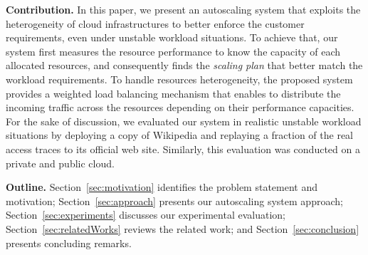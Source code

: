 




\textbf{Contribution.}  In this paper, we present an autoscaling system that exploits the heterogeneity of cloud infrastructures to better enforce the customer requirements, even under unstable workload situations. To achieve that, our system first measures the resource performance to know the capacity of each allocated resources, and consequently finds the \emph{scaling plan} that better match the workload requirements. To handle resources heterogeneity, the proposed system provides a weighted load balancing mechanism that enables to distribute the incoming traffic across the resources depending on their performance capacities.
For the sake of discussion, we evaluated our system in realistic unstable workload situations by deploying a copy of Wikipedia and replaying a fraction of the real access traces to its official web site. Similarly, this evaluation was conducted on a private and public cloud.






\textbf{Outline.} Section~\ref{sec:motivation} identifies the problem statement and motivation; Section~\ref{sec:approach} presents our autoscaling system approach; Section~\ref{sec:experiments} discusses our experimental evaluation; Section~\ref{sec:relatedWorks} reviews the related work; and Section~\ref{sec:conclusion} presents concluding remarks.